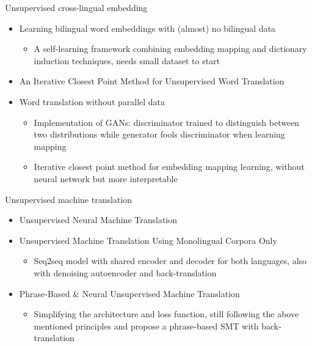 \documentclass[11pt, a4paper, landscape]{article}
\begin{document}
	
	
	
	\NewPage
	
	\vfill
	Unsupervised cross-lingual embedding
	\begin{itemize}
		\item 	\cite{artetxe2017learning} Learning bilingual word embeddings with (almost) no bilingual data
		\begin{itemize}
			\item A self-learning framework combining embedding mapping and dictionary induction techniques, needs small dataset to start
		\end{itemize}	    
		\item \cite{hoshen2018iterative} An Iterative Closest Point Method for Unsupervised Word Translation	
		\item 	\cite{conneau2017word} Word translation without parallel data
		\begin{itemize}
			\item Implementation of GANs: discriminator trained to distinguish between two distributions while generator fools discriminator when learning mapping
		\end{itemize}	    
		\begin{itemize}
			\item Iterative closest point method for embedding mapping learning, without neural network but more interpretable	
		\end{itemize}	    
	\end{itemize}
	
	
	
	
	
	
	\vfill
	
	\NewPage
	
	\vfill
	Unsupervised machine translation
	\begin{itemize}
		\item 	\cite{artetxe2017unsupervised} Unsupervised Neural Machine Translation
		\item \cite{lample2017unsupervised} Unsupervised Machine Translation Using Monolingual Corpora Only
		\begin{itemize} 
			\item Seq2seq model with shared encoder and decoder for both languages, also with denoising autoencoder and back-translation
		\end{itemize}
		
		\item \cite{artetxe2017unsupervised} Phrase-Based \& Neural Unsupervised Machine Translation
		\begin{itemize}
			\item Simplifying the architecture and loss function, still following the above mentioned principles and propose a phrase-based SMT with back-translation
		\end{itemize}	
		

	\end{itemize}
	
\end{document}
